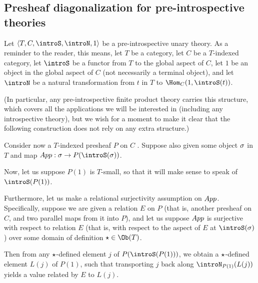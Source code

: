 \subsection{Presheaf diagonalization for pre-introspective theories}
\begin{theorem}\label{RevampedPreintroLawvere}
Let $\langle T, C, \introS, \introN, 1 \rangle$ be a pre-introspective unary theory. As a reminder to the reader, this means, let $T$ be a category, let $C$ be a $T$-indexed category, let $\introS$ be a functor from $T$ to the global aspect of $C$, let $1$ be an object in the global aspect of $C$ (not necessarily a terminal object), and let $\introN$ be a natural transformation from $t$ in $T$ to $\Hom_C(1, \introS(t))$.

(In particular, any pre-introspective finite product theory carries this structure, which covers all the applications we will be interested in (including any introspective theory), but we wish for a moment to make it clear that the following construction does not rely on any extra structure.)

Consider now a $T$-indexed presheaf $P$ on $C$ . Suppose also given some object $\sigma$ in $T$ and map $\App : \surjSource \to P(\introS(\surjSource))$.

Now, let us suppose $P(1)$ is $T$-small, so that it will make sense to speak of $\introS(P(1))$.

Furthermore, let us make a relational surjectivity assumption on $App$. Specifically, suppose we are given a relation $E$ on $P$ (that is, another presheaf on $C$, and two parallel maps from it into $P$), and let us suppose $App$ is surjective with respect to relation $E$ (that is, with respect to the aspect of $E$ at $\introS(\surjSource)$) over some domain of definition $\point \in \Ob(T)$.

Then from any $\star$-defined element $j$ of $P(\introS(P(1)))$, we obtain a $\star$-defined element $L(j)$ of $P(1)$, such that transporting $j$ back along $\introN_{P(1)}(L(j))$ yields a value related by $E$ to $L(j)$.
\end{theorem}
